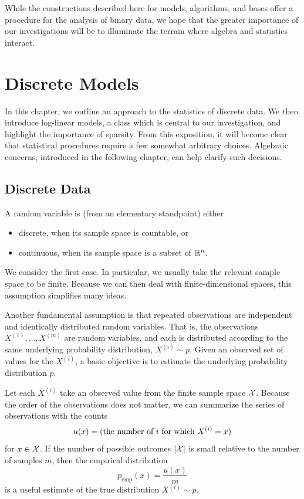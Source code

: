 \documentclass[cclicense]{hmcthesis}
\newcommand*{\x}[1]{\ensuremath{X^{(#1)}}}
\newcommand*{\emp}{\mathrm{emp}}
\numberwithin{equation}{chapter}
\numberwithin{ucounter}{chapter}
\begin{document}
    While the constructions described here for models, algorithms, and bases
    offer a procedure for the analysis of binary data, we hope that the greater
    importance of our investigations will be to illuminate the terrain where
    algebra and statistics interact.

\chapter{Discrete Models}

    In this chapter, we outline an approach to the statistics of discrete data.
    We then introduce log-linear models, a class which is central to our
    investigation, and highlight the importance of sparsity.  From this
    exposition, it will become clear that statistical procedures require a few
    somewhat arbitrary choices.  Algebraic concerns, introduced in the following
    chapter, can help clarify such decisions.

    \section{Discrete Data}

    A random variable is (from an elementary standpoint) either
    \begin{itemize}\noparspace
    \item discrete, when its sample space is countable, or
    \item continuous, when its sample space is a subset of $\mathbb{R}^n$.
    \end{itemize}
    We consider the first case.  In particular, we usually take the relevant
    sample space to be finite.  Because we can then deal with
    finite-dimensional spaces, this assumption simplifies many ideas.

    Another fundamental assumption is that repeated observations are independent and
    identically distributed random variables.  That is, the observations $\x 1,
    \ldots, \x m$ are random variables, and each is distributed according to the
    same underlying probability distribution, $\x i \sim p$.  Given an observed
    set of values for the $\x i$, a basic objective is to estimate the
    underlying probability distribution $p$.

    Let each $\x i$ take an observed value from the finite sample space $\mathcal{X}$.
    Because the order of the observations does not matter, we can summarize the
    series of observations with the counts
    \begin{equation*}
        u(x) = \pdel{\text{the number of $i$ for which $\x i = x$}}
    \end{equation*}
    for $x \in \mathcal{X}$.  If the number of possible outcomes $|\mathcal{X}|$ is small
    relative to the number of samples $m$, then the empirical distribution
    \begin{equation}
        p_\emp(x) = \frac{u(x)}{m}
        \label{eq:empirical}
    \end{equation}
    is a useful estimate of the true distribution $\x i \sim p$.
\end{document}
